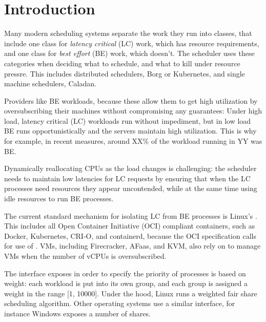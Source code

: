 \section{Introduction}
\label{s:intro}

Many modern scheduling systems separate the work they run into classes, that
include one class for \textit{latency critical} (LC) work, which has resource
requirements, and one class for \textit{best effort} (BE) work, which doesn't.
The scheduler uses these categories when deciding what to schedule, and what to
kill under resource pressre. This includes distributed schedulers, \eg{}
Borg\cite{TODO} or Kubernetes\cite{TODO}, and single machine schedulers, \eg{}
Caladan\cite{TODO}. 

Providers like BE workloads, because these allow them to get high utilization by
oversubscribing their machines without compromising any guarantees: Under high
load, latency critical (LC) workloads run without impediment, but in low load BE
runs opportunistically and the servers maintain high utilization. This is why for example, in
recent measures, around XX\% of the workload running in YY was BE.

Dynamically reallocating CPUs as the load changes is challenging: the scheduler
needs to maintain low latencies for LC requests by ensuring that when the LC
processes need resources they appear uncontended, while at the same time using
idle resources to run BE processes.

The current standard mechanism for isolating LC from BE processes is Linux's
\cgroups{}. This includes all Open Container Initiative (OCI) compliant
containers, such as Docker, Kubernetes, CRI-O, and containerd, because the OCI
specification calls for use of \cgroups{}. VMs, including Firecracker, AFaas,
and KVM, also rely on \cgroups{} to manage VMs when the number of vCPUs is
oversubscribed.

The interface \cgroups{} exposes in order to specify the priority of processes
is based on weight: each workload is put into its own group, and each group is
assigned a weight in the range [1, 10000]. Under the hood, Linux runs a weighted
fair share scheduling algorithm. Other operating systems use a similar
interface, for instance Windows exposes a number of shares. 

